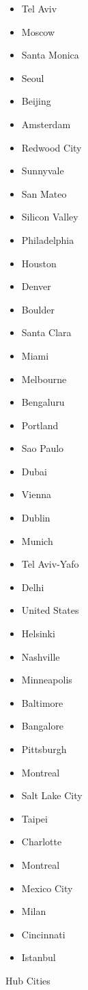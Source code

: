 \begin{figure}[ht]
\begin{multicols}{2}
\begin{itemize}
    \item Tel Aviv
    \item Moscow
    \item Santa Monica
    \item Seoul
    \item Beijing
    \item Amsterdam
    \item Redwood City
    \item Sunnyvale
    \item San Mateo
    \item Silicon Valley
    \item Philadelphia
    \item Houston
    \item Denver
    \item Boulder
    \item Santa Clara
    \item Miami
    \item Melbourne
    \item Bengaluru
    \item Portland
    \item Sao Paulo
    \item Dubai
    \item Vienna
    \item Dublin
    \item Munich
    \item Tel Aviv-Yafo
    \item Delhi
    \item United States
    \item Helsinki
    \item Nashville
    \item Minneapolis
    \item Baltimore
    \item Bangalore
    \item Pittsburgh
    \item Montreal
    \item Salt Lake City
    \item Taipei
    \item Charlotte
    \item Montreal
    \item Mexico City
    \item Milan
    \item Cincinnati
    \item Istanbul
  \end{itemize}
\end{multicols}
\caption{Hub Cities}
\label{vcwiz:fig:hubs}
\end{figure}

